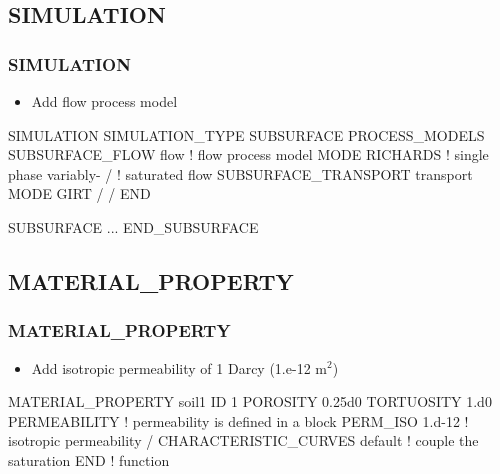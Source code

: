 \documentclass{beamer}
\newcommand\bluecomment[1]{{{\color{blue} #1}}}
\newcommand\magentacomment[1]{{{\color{magenta} #1}}}
\begin{document}
\subsection{SIMULATION}

\begin{frame}[fragile]\frametitle{SIMULATION}

\begin{itemize}
  \item Add flow process model
\end{itemize}


\begin{semiverbatim}
SIMULATION
  SIMULATION_TYPE SUBSURFACE
  PROCESS_MODELS
    \magentacomment{SUBSURFACE_FLOW flow}  \bluecomment{! flow process model}
      \magentacomment{MODE RICHARDS}       \bluecomment{! single phase variably-}
    \magentacomment{/}                     \bluecomment{!   saturated flow}
    SUBSURFACE_TRANSPORT transport
      MODE GIRT
    /
  /
END

SUBSURFACE
  ...
END_SUBSURFACE
\end{semiverbatim}

\end{frame}

\subsection{MATERIAL\_PROPERTY}

\begin{frame}[fragile]\frametitle{MATERIAL\_PROPERTY}

\begin{itemize}
\item Add isotropic permeability of 1 Darcy (1.e-12 m$^2$)
\end{itemize}

\begin{semiverbatim}
MATERIAL_PROPERTY soil1
  ID 1
  POROSITY 0.25d0
  TORTUOSITY 1.d0
  \magentacomment{PERMEABILITY}     \bluecomment{! permeability is defined in a block}
    \magentacomment{PERM_ISO 1.d-12}  \bluecomment{! isotropic permeability}
  \magentacomment{/}
  \magentacomment{CHARACTERISTIC_CURVES default}  \bluecomment{! couple the saturation}
END                              \bluecomment{!   function}
\end{semiverbatim}

\end{frame}
\end{document}
